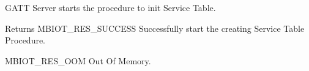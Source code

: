G\+A\+TT Server starts the procedure to init Service Table. 

\begin{DoxyReturn}{Returns}
M\+B\+I\+O\+T\+\_\+\+R\+E\+S\+\_\+\+S\+U\+C\+C\+E\+SS Successfully start the creating Service Table Procedure. 

M\+B\+I\+O\+T\+\_\+\+R\+E\+S\+\_\+\+O\+OM Out Of Memory. 
\end{DoxyReturn}
